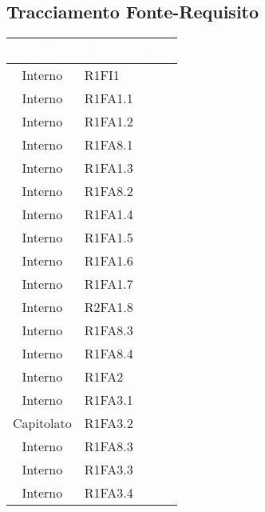 \subsection{Tracciamento Fonte-Requisito}
{
\renewcommand{\arraystretch}{1.5}
\centering
\begin{longtable}{ c C{4cm} c c}
\textcolor{white}{\textbf{Fonte}} & \textcolor{white}{\textbf{Requisito}}\\	
\endhead


Interno & R1FI1\\

Interno & R1FA1.1\\

Interno & R1FA1.2\\

Interno & R1FA8.1\\

Interno & R1FA1.3\\

Interno & R1FA8.2\\

Interno & R1FA1.4\\

Interno & R1FA1.5\\

Interno & R1FA1.6\\

Interno & R1FA1.7\\


Interno & R2FA1.8\\

Interno & R1FA8.3\\

Interno & R1FA8.4\\

Interno & R1FA2\\

Interno & R1FA3.1\\

Capitolato & R1FA3.2\\

Interno & R1FA8.3\\

Interno & R1FA3.3\\

Interno & R1FA3.4\\



\end{longtable}}
